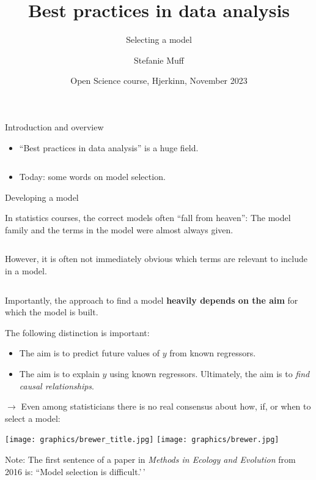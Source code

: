 \documentclass[
  10pt,
  ignorenonframetext,
]{beamer}
\title{Best practices in data analysis}
\subtitle{Selecting a model}
\author{Stefanie Muff}
\date{Open Science course, Hjerkinn, November 2023}
\providecommand{\tightlist}{%
  \setlength{\itemsep}{0pt}\setlength{\parskip}{0pt}}
\begin{document}
\frame{\titlepage}

\begin{frame}
\begin{block}{Introduction and overview}
\protect\hypertarget{introduction-and-overview}{}
\(~\)

\begin{itemize}
\tightlist
\item
  ``Best practices in data analysis'' is a huge field.
\end{itemize}

\(~\)

\begin{itemize}
\tightlist
\item
  Today: some words on model selection.
\end{itemize}
\end{block}
\end{frame}

\begin{frame}
\begin{block}{Developing a model}
\protect\hypertarget{developing-a-model}{}
\(~\)

In statistics courses, the correct models often ``fall from heaven'':
The model family and the terms in the model were almost always given.

\(~\)

However, it is often not immediately obvious which terms are relevant to
include in a model.

\(~\)

Importantly, the approach to find a model \textbf{heavily depends on the
aim} for which the model is built.\\
\(~\)

The following distinction is important:

\begin{itemize}
\tightlist
\item
  The aim is to \alert{predict} future values of \(y\) from known
  regressors.
\item
  The aim is to \alert{explain} \(y\) using known regressors.
  Ultimately, the aim is to \emph{find causal relationships}.
\end{itemize}
\end{block}
\end{frame}

\begin{frame}
\(\rightarrow\) Even among statisticians there is no real consensus
about how, if, or when to select a model:

\texttt{[image: graphics/brewer\_title.jpg]}
\texttt{[image: graphics/brewer.jpg]}

Note: The first sentence of a paper in \emph{Methods in Ecology and
Evolution} from 2016 is: ``Model selection is difficult.'\,'
\end{frame}
\end{document}
